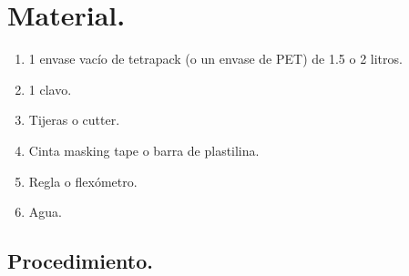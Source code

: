 \documentclass[14pt]{extarticle}
\begin{document}
\section{Material.}

\begin{enumerate}[label=\roman*)]
\item 1 envase vacío de tetrapack (o un envase de PET) de 1.5 o 2 litros.
\item 1 clavo.
\item Tijeras o cutter.
\item Cinta masking tape o barra de plastilina.
\item Regla o flexómetro.
\item Agua.
\end{enumerate}

\subsection{Procedimiento.}
\end{document}
